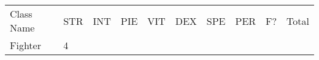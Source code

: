 \documentclass[12pt]{article}
\newcommand{\indexClass}[1]{\index{#1}}
\newcommand{\class}[1]{#1\indexClass{#1}}
\begin{document}
\begin{longtable}[]{@{}llllllllll@{}}
\toprule
\begin{minipage}[t]{0.13\columnwidth}\raggedright\strut
Class Name
\strut\end{minipage} &
\begin{minipage}[t]{0.06\columnwidth}\raggedright\strut
STR
\strut\end{minipage} &
\begin{minipage}[t]{0.06\columnwidth}\raggedright\strut
INT
\strut\end{minipage} &
\begin{minipage}[t]{0.06\columnwidth}\raggedright\strut
PIE
\strut\end{minipage} &
\begin{minipage}[t]{0.06\columnwidth}\raggedright\strut
VIT
\strut\end{minipage} &
\begin{minipage}[t]{0.06\columnwidth}\raggedright\strut
DEX
\strut\end{minipage} &
\begin{minipage}[t]{0.06\columnwidth}\raggedright\strut
SPE
\strut\end{minipage} &
\begin{minipage}[t]{0.06\columnwidth}\raggedright\strut
PER
\strut\end{minipage} &
\begin{minipage}[t]{0.07\columnwidth}\raggedright\strut
F?
\strut\end{minipage} &
\begin{minipage}[t]{0.08\columnwidth}\raggedright\strut
Total
\strut\end{minipage}\tabularnewline
\begin{minipage}[t]{0.13\columnwidth}\raggedright\strut
\class{Fighter}
\strut\end{minipage} &
\begin{minipage}[t]{0.06\columnwidth}\raggedright\strut
4
\strut\end{minipage} &
\begin{minipage}[t]{0.06\columnwidth}\raggedright\strut
\strut\end{minipage} &
\begin{minipage}[t]{0.06\columnwidth}\raggedright\strut
\strut\end{minipage} &
\begin{minipage}[t]{0.06\columnwidth}\raggedright\strut
\strut\end{minipage} &
\begin{minipage}[t]{0.06\columnwidth}\raggedright\strut

\end{minipage}
\end{longtable}
\end{document}
